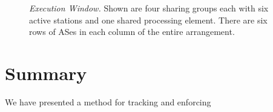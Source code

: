 \documentclass[10pt,twocolumn]{article}
\begin{document}
%
\begin{figure*}
\centering
{}
\caption{{\em Execution Window.} Shown are four sharing groups
each with six active stations and one shared processing element.
There are six rows of ASes in each column of the entire arrangement.}
\label{fig:window}
\end{figure*}
%





%
%
\vspace{-0.25in}
\section{Summary}
\vspace{-0.15in}
%
We have presented a method for tracking and enforcing


%


%
\end{document}
